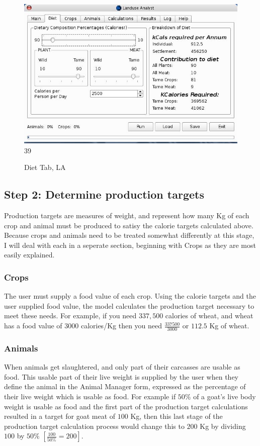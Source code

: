 \begin{figure}[htbp]
  \label{fig:LADiet}%
    \includegraphics[scale=.355]{./images/LanduseAnalystDiet545.jpg}
39
  \caption{ Diet Tab, LA}
\end{figure}

\subsection{Step 2: Determine production targets}
  Production targets are measures of weight, and represent how many Kg of each
  crop and animal must be produced to satisy the calorie targets calculated
  above.  Because crops and animals need to be treated somewhat differently at
  this stage, I will deal with each in a seperate section, beginning with Crops
  as they are most easily explained.

  \subsubsection{Crops}
The user must supply a food value of each crop.  Using the calorie targets and
the user supplied food value, the model calculates the production target
necessary to meet these needs.  For example, if you need $337,500$ calories of
wheat, and wheat has a food value of $3000$ calories/Kg then you need
$\frac{337500}{3000}$ or $112.5$ Kg of wheat.

  \subsubsection{Animals}
When animals get slaughtered, and only part of their carcasses are usable as
food.  This usable part of their live weight is supplied by the user when they
define the animal in the Animal Manager form, expressed as the percentage of
their live weight which is usable as food. For example if $50\%$ of a goat's
live body weight is usable as food and the first part of the production target
calculations resulted in a target for goat meat of $100$ Kg, then this last
stage of the production target calculation process would change this to $200$
Kg by dividing $100$ by $50\%$   $\left[ \frac{100}{50\%}=200\right]$.

